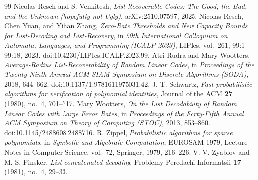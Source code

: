 \documentclass[10pt,a4paper]{amsart}
\begin{document}
\begin{thebibliography}{99}
 Nicolas Resch and S. Venkitesh, \emph{List Recoverable Codes: The Good, the Bad, and the Unknown (hopefully not Ugly)}, arXiv:2510.07597, 2025.
 Nicolas Resch, Chen Yuan, and Yihan Zhang, \emph{Zero-Rate Thresholds and New Capacity Bounds for List-Decoding and List-Recovery}, in \emph{50th International Colloquium on Automata, Languages, and Programming (ICALP 2023)}, LIPIcs, vol.~261, 99:1--99:18, 2023. doi:10.4230/LIPIcs.ICALP.2023.99.
 Atri Rudra and Mary Wootters, \emph{Average-Radius List-Recoverability of Random Linear Codes}, in \emph{Proceedings of the Twenty-Ninth Annual ACM-SIAM Symposium on Discrete Algorithms (SODA)}, 2018, 644--662. doi:10.1137/1.9781611975031.42.
 J. T. Schwartz, \emph{Fast probabilistic algorithms for verification of polynomial identities}, Journal of the ACM \textbf{27} (1980), no.~4, 701--717.
 Mary Wootters, \emph{On the List Decodability of Random Linear Codes with Large Error Rates}, in \emph{Proceedings of the Forty-Fifth Annual ACM Symposium on Theory of Computing (STOC)}, 2013, 853--860. doi:10.1145/2488608.2488716.
 R. Zippel, \emph{Probabilistic algorithms for sparse polynomials}, in \emph{Symbolic and Algebraic Computation}, EUROSAM 1979, Lecture Notes in Computer Science, vol.~72, Springer, 1979, 216--226.
 V. V. Zyablov and M. S. Pinsker, \emph{List concatenated decoding}, Problemy Peredachi Informatsii \textbf{17} (1981), no.~4, 29--33.
\end{thebibliography}
\end{document}
